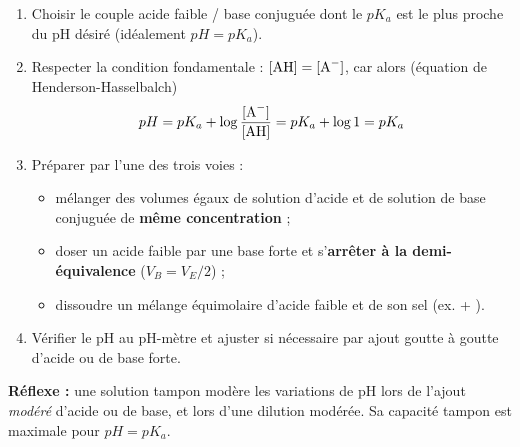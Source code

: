 \documentclass[11pt]{article}
\newcommand{\cle}[1]{{\popxbold\color{popdark}#1}}
\begin{document}
\begin{methode}[Préparer une solution tampon de pH = pKa]
\begin{enumerate}
\item \cle{Choisir} le couple acide faible / base conjuguée dont le $pK_a$ est le plus proche du pH désiré (idéalement $pH = pK_a$).
\item \cle{Respecter} la condition fondamentale : $[\ce{AH}] = [\ce{A-}]$, car alors (équation de Henderson-Hasselbalch)
\[ pH = pK_a + \log\frac{[\ce{A-}]}{[\ce{AH}]} = pK_a + \log 1 = pK_a \]
\item \cle{Préparer} par l'une des trois voies :
\begin{itemize}
\item mélanger des volumes égaux de solution d'acide  et de solution de base conjuguée  de \textbf{même concentration} ;
\item doser un acide faible par une base forte et s'\textbf{arrêter à la demi-équivalence} ($V_B = V_E/2$) ;
\item dissoudre un mélange équimolaire d'acide faible et de son sel (ex.  + ).
\end{itemize}
\item \cle{Vérifier} le pH au pH-mètre et ajuster si nécessaire par ajout goutte à goutte d'acide ou de base forte.
\end{enumerate}
\textbf{Réflexe :} une solution tampon modère les variations de pH lors de l'ajout \emph{modéré} d'acide ou de base, et lors d'une dilution modérée. Sa capacité tampon est maximale pour $pH = pK_a$.
\end{methode}
\end{document}
